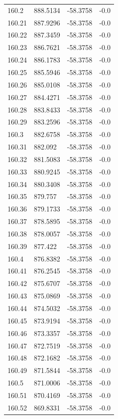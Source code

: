 \begin{table}[H]
\begin{tabular}{llll}
160.2 & 888.5134 & -58.3758 & -0.0 \\
160.21 & 887.9296 & -58.3758 & -0.0 \\
160.22 & 887.3459 & -58.3758 & -0.0 \\
160.23 & 886.7621 & -58.3758 & -0.0 \\
160.24 & 886.1783 & -58.3758 & -0.0 \\
160.25 & 885.5946 & -58.3758 & -0.0 \\
160.26 & 885.0108 & -58.3758 & -0.0 \\
160.27 & 884.4271 & -58.3758 & -0.0 \\
160.28 & 883.8433 & -58.3758 & -0.0 \\
160.29 & 883.2596 & -58.3758 & -0.0 \\
160.3 & 882.6758 & -58.3758 & -0.0 \\
160.31 & 882.092 & -58.3758 & -0.0 \\
160.32 & 881.5083 & -58.3758 & -0.0 \\
160.33 & 880.9245 & -58.3758 & -0.0 \\
160.34 & 880.3408 & -58.3758 & -0.0 \\
160.35 & 879.757 & -58.3758 & -0.0 \\
160.36 & 879.1733 & -58.3758 & -0.0 \\
160.37 & 878.5895 & -58.3758 & -0.0 \\
160.38 & 878.0057 & -58.3758 & -0.0 \\
160.39 & 877.422 & -58.3758 & -0.0 \\
160.4 & 876.8382 & -58.3758 & -0.0 \\
160.41 & 876.2545 & -58.3758 & -0.0 \\
160.42 & 875.6707 & -58.3758 & -0.0 \\
160.43 & 875.0869 & -58.3758 & -0.0 \\
160.44 & 874.5032 & -58.3758 & -0.0 \\
160.45 & 873.9194 & -58.3758 & -0.0 \\
160.46 & 873.3357 & -58.3758 & -0.0 \\
160.47 & 872.7519 & -58.3758 & -0.0 \\
160.48 & 872.1682 & -58.3758 & -0.0 \\
160.49 & 871.5844 & -58.3758 & -0.0 \\
160.5 & 871.0006 & -58.3758 & -0.0 \\
160.51 & 870.4169 & -58.3758 & -0.0 \\
160.52 & 869.8331 & -58.3758 & -0.0 \\

\end{tabular}
\end{table}
